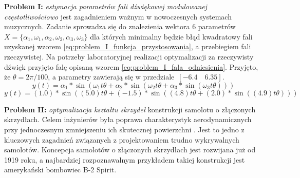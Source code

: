 \par
\textbf{Problem I:} \emph{estymacja parametrów fali dźwiękowej modulowanej częstotliwościowo} jest zagadnieniem ważnym w nowoczesnych systemach muzycznych. Zadanie sprowadza się do znalezienia wektora 6 parametrów $X = \lbrace\alpha_1, \omega_1, \alpha_2, \omega_2, \alpha_3, \omega_3\rbrace$ dla których minimalny będzie błąd kwadratowy fali uzyskanej wzorem \ref{eq:problem_I_funkcja_przystosowania}, a przebiegiem fali rzeczywistej. Na potrzeby laboratoryjnej realizacji optymalizacji za rzeczywisty dźwięk przyjęto falę opisaną wzorem \ref{eq:problem_I_fala_odniesienia}. Przyjęto, że $\theta = 2\pi/100$, a parametry zawierają się w przedziale~$[-6.4\quad6.35]$.
\begin{equation} \label{eq:problem_I_funkcja_przystosowania}
y(t)=\alpha_1*\sin(\omega_1 t\theta + \alpha_2*\sin(\omega_2 t\theta + \alpha_3*\sin(\omega_3 t\theta)))
\end{equation}
\begin{equation} \label{eq:problem_I_fala_odniesienia}
y(t)=(1.0)*\sin((5.0) t\theta + (-1.5)*\sin((4.8) t\theta + (2.0)*\sin((4.9) t\theta)))
\end{equation}
\par
\textbf{Problem II:} \emph{optymalizacja kształtu skrzydeł} konstrukcji samolotu o złączonych skrzydłach. Celem inżynierów była poprawa charakterystyk aerodynamicznych przy jednoczesnym zmniejszeniu ich skutecznej powierzchni \cite{lee2007multi}. Jest to jedno z kluczowych zagadnień związanych z projektowaniem trudno wykrywalnych samolotów. Koncepcja samolotów o złączonych skrzydłach jest rozwijana już od 1919 roku, a najbardziej rozpoznawalnym przykładem takiej konstrukcji jest amerykański bombowiec B-2 Spirit. 
\par
